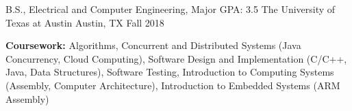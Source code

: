 \begin{cventries}
  \cventry
    {B.S., Electrical and Computer Engineering, Major GPA: 3.5}
    {The University of Texas at Austin}
    {Austin, TX}
    {Fall 2018}
    {
      \begin{cvitems}
        \item {\textbf{Coursework:} Algorithms, Concurrent and Distributed Systems (Java Concurrency, Cloud Computing), Software Design and Implementation (C/C++, Java, Data Structures), Software Testing, Introduction to Computing Systems (Assembly, Computer Architecture), Introduction to Embedded Systems (ARM Assembly)}
      \end{cvitems}
    }
\end{cventries}
